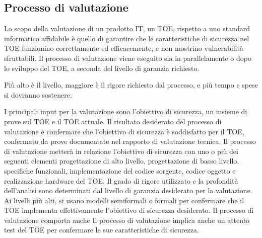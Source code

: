 \subsection{Processo di valutazione}
Lo scopo della valutazione di un prodotto IT, un TOE, rispetto a uno standard informatico affidabile è quello di garantire che le caratteristiche di sicurezza nel TOE funzionino correttamente ed efficacemente, e non mostrino vulnerabilità sfruttabili. Il processo di valutazione viene eseguito sia in parallelamente o dopo lo sviluppo del TOE, a seconda del livello di garanzia richiesto.

\singlespacing

Più alto è il livello, maggiore è il rigore richiesto dal processo, e più tempo e spese si dovranno sostenere.

\singlespacing

I principali input per la valutazione sono l'obiettivo di sicurezza, un insieme di prove sul TOE e il TOE attuale. Il risultato desiderato del processo di valutazione è confermare che l'obiettivo di sicurezza è soddisfatto per il TOE, confermato da prove documentate nel rapporto di valutazione tecnica. Il processo di valutazione metterà in relazione l'obiettivo di sicurezza con uno o più dei seguenti elementi progettazione di alto livello, progettazione di basso livello, specifiche funzionali, implementazione del codice sorgente, codice oggetto e realizzazione hardware del TOE. Il grado di rigore utilizzato e la profondità dell'analisi sono determinati dal livello di garanzia desiderato per la valutazione. Ai livelli più alti, si usano modelli semiformali o formali per confermare che il TOE implementa effettivamente l'obiettivo di sicurezza desiderato. Il processo di valutazione comporta anche Il processo di valutazione implica anche un attento test del TOE per confermare le sue caratteristiche di sicurezza.

\singlespacing


